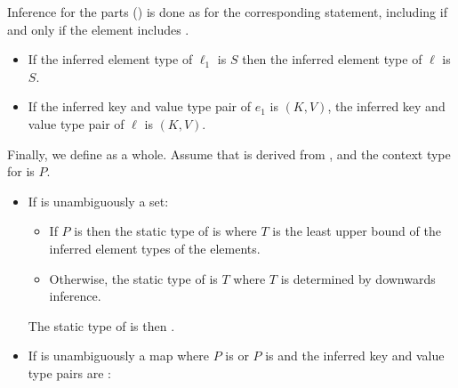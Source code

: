 \documentclass[makeidx]{article}
\begin{document}
{

\LMHash{}%
Inference for the parts
()
is done as for the corresponding \FOR{} statement,
including \AWAIT{} if and only if the element includes \AWAIT.

\begin{itemize}
\item
  If the inferred element type of $\ell_1$ is $S$ then
  the inferred element type of $\ell$ is $S$.
\item
  If the inferred key and value type pair of $e_1$ is $(K, V)$,
  the inferred key and value type pair of $\ell$ is $(K, V)$.
\end{itemize}

\vspace{3mm}
\EndCase

\LMHash{}%
Finally, we define
as a whole.
%
Assume that  is derived from ,
and the context type for  is $P$.

\begin{itemize}
\item
  If  is unambiguously a set:

  \begin{itemize}
  \item
    If $P$ is \FreeContext{} then
    the static type of  is 
    where $T$ is the least upper bound of
    the inferred element types of the elements.
  \item
    Otherwise, the static type of  is $T$
    where $T$ is determined by downwards inference.

  \end{itemize}

  The static type of  is then .
\item
  If  is unambiguously a map
  where $P$ is  or $P$ is \FreeContext{}
  and the inferred key and value type pairs are
  :


\end{itemize}}
\end{document}
